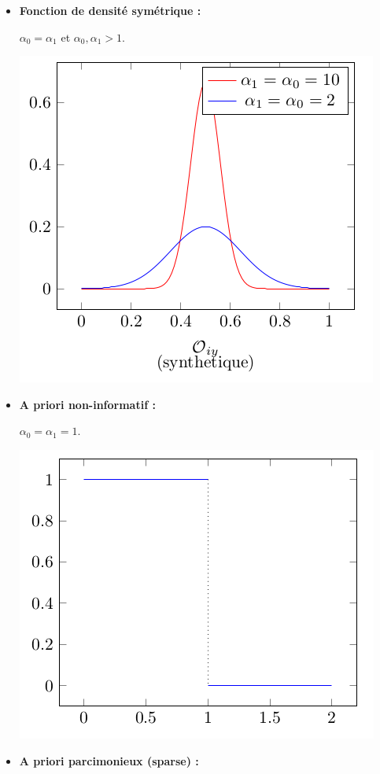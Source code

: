 \documentclass{article}
\begin{document}
\begin{itemize}
\item \textbf{Fonction de densité symétrique : }

$\alpha_0 = \alpha_1$ et $\alpha_0, \alpha_1 > 1$.

\includegraphics[scale=0.4]{schema1.png}

\item \textbf{A priori non-informatif : }

$\alpha_0 = \alpha_1 = 1$.

\includegraphics[scale=0.4]{schema2.png}

\item \textbf{A priori parcimonieux (sparse) : }


\end{itemize}
\end{document}
